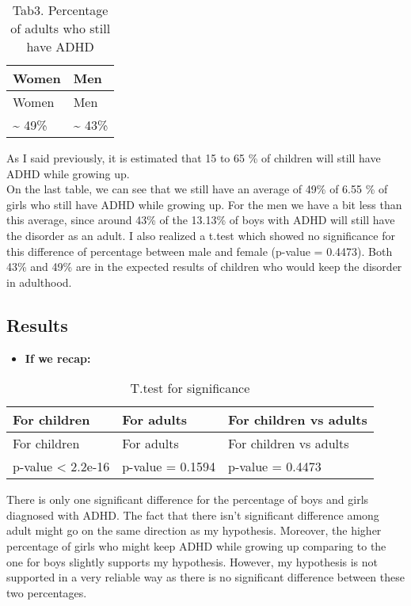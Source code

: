 \documentclass[
]{article}
\providecommand{\tightlist}{%
  \setlength{\itemsep}{0pt}\setlength{\parskip}{0pt}}
\begin{document}
\begin{longtable}[]{@{}ll@{}}
\caption{Tab3. Percentage of adults who still have ADHD}\tabularnewline
\toprule()
Women & Men \\
\midrule()
\endfirsthead
\toprule()
Women & Men \\
\midrule()
\endhead
\textasciitilde{} 49\% & \textasciitilde{} 43\% \\
\bottomrule()
\end{longtable}

As I said previously, it is estimated that 15 to 65 \% of children will
still have ADHD while growing up.\\
On the last table, we can see that we still have an average of 49\% of
6.55 \% of girls who still have ADHD while growing up. For the men we
have a bit less than this average, since around 43\% of the 13.13\% of
boys with ADHD will still have the disorder as an adult. I also realized
a t.test which showed no significance for this difference of percentage
between male and female (p-value = 0.4473). Both 43\% and 49\% are in
the expected results of children who would keep the disorder in
adulthood.

\hypertarget{results}{%
\subsection{Results}\label{results}}

\begin{itemize}
\tightlist
\item
  \textbf{If we recap:}
\end{itemize}

\begin{longtable}[]{@{}lll@{}}
\caption{T.test for significance}\tabularnewline
\toprule()
For children & For adults & For children vs adults \\
\midrule()
\endfirsthead
\toprule()
For children & For adults & For children vs adults \\
\midrule()
\endhead
p-value \textless{} 2.2e-16 & p-value = 0.1594 & p-value = 0.4473 \\
\bottomrule()
\end{longtable}

There is only one significant difference for the percentage of boys and
girls diagnosed with ADHD. The fact that there isn't significant
difference among adult might go on the same direction as my hypothesis.
Moreover, the higher percentage of girls who might keep ADHD while
growing up comparing to the one for boys slightly supports my
hypothesis. However, my hypothesis is not supported in a very reliable
way as there is no significant difference between these two percentages.
\end{document}
